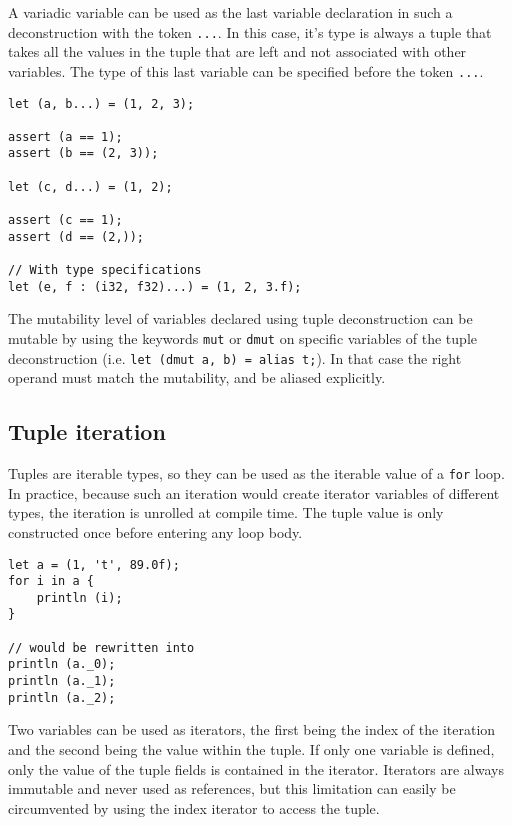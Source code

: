 A variadic variable can be used as the last variable declaration in such a
deconstruction with the token \texttt{...}. In this case, it's type is always a
tuple that takes all the values in the tuple that are left and not associated
with other variables. The type of this last variable can be specified before the
token \texttt{...}.

\begin{lstlisting}[style=coloredverbatim]
let (a, b...) = (1, 2, 3);

assert (a == 1);
assert (b == (2, 3));

let (c, d...) = (1, 2);

assert (c == 1);
assert (d == (2,));

// With type specifications
let (e, f : (i32, f32)...) = (1, 2, 3.f);
\end{lstlisting}

The mutability level of variables declared using tuple deconstruction can be
mutable by using the keywords \texttt{mut} or \texttt{dmut} on specific
variables of the tuple deconstruction (i.e. \texttt{let (dmut a, b) = alias
  t;}). In that case the right operand must match the mutability, and be aliased
explicitly.


\subsection {Tuple iteration}

Tuples are iterable types, so they can be used as the iterable value of a
\texttt{for} loop. In practice, because such an iteration would create iterator
variables of different types, the iteration is unrolled at compile time. The
tuple value is only constructed once before entering any loop body.

\begin{lstlisting}[style=coloredverbatim]
let a = (1, 't', 89.0f);
for i in a {
    println (i);
}

// would be rewritten into
println (a._0);
println (a._1);
println (a._2);
\end{lstlisting}

Two variables can be used as iterators, the first being the index of the
iteration and the second being the value within the tuple. If only one variable
is defined, only the value of the tuple fields is contained in the iterator.
Iterators are always immutable and never used as references, but this limitation
can easily be circumvented by using the index iterator to access the tuple.

